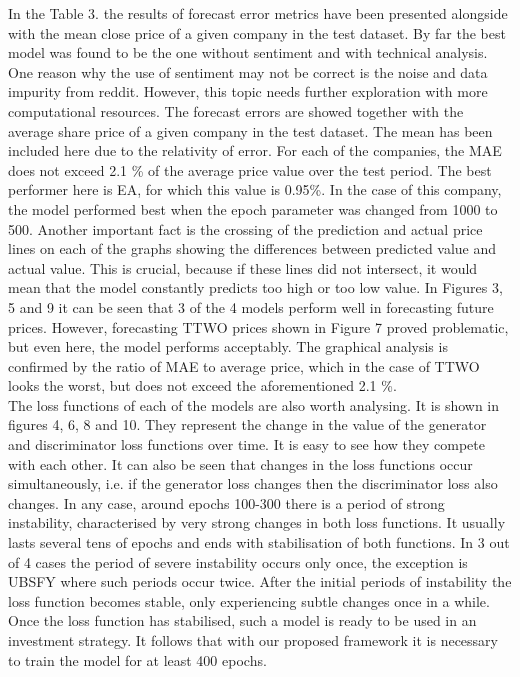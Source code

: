 \documentclass[11pt]{article} %
\begin{document}
In the Table 3. the results of forecast error metrics have been presented alongside with the mean close price of a given company in the test dataset. By far the best model was found to be the one without sentiment and with technical analysis. One reason why the use of sentiment may not be correct is the noise and data impurity from reddit. However, this topic needs further exploration with more computational resources. 
The forecast errors are showed together with the average share price of a given company in the test dataset. The mean has been included here due to the relativity of error. For each of the companies, the MAE does not exceed 2.1 \% of the average price value over the test period. The best performer here is EA, for which this value is 0.95\%.  In the case of this company, the model performed best when the epoch parameter was changed from 1000 to 500. Another important fact is the crossing of the prediction and actual price lines on each of the graphs showing the differences between predicted value and actual value. This is crucial, because if these lines did not intersect, it would mean that the model constantly predicts too high or too low value. In Figures 3, 5 and 9 it can be seen that 3 of the 4 models perform well in forecasting future prices. However, forecasting TTWO prices shown in Figure 7 proved problematic, but even here, the model performs acceptably. The graphical analysis is confirmed by the ratio of MAE to average price, which in the case of TTWO looks the worst, but does not exceed the aforementioned 2.1 \%.
\\

The loss functions of each of the models are also worth analysing. It is shown in figures 4, 6, 8 and 10. They represent the change in the value of the generator and discriminator loss functions over time. It is easy to see how they compete with each other. It can also be seen that changes in the loss functions occur simultaneously, i.e. if the generator loss changes then the discriminator loss also changes. In any case, around epochs 100-300 there is a period of strong instability, characterised by very strong changes in both loss functions. It usually lasts several tens of epochs and ends with stabilisation of both functions. In 3 out of 4 cases the period of severe instability occurs only once, the exception is UBSFY where such periods occur twice. After the initial periods of instability the loss function becomes stable, only experiencing subtle changes once in a while. Once the loss function has stabilised, such a model is ready to be used in an investment strategy. It follows that with our proposed framework it is necessary to train the model for at least 400 epochs. 
\end{document}
